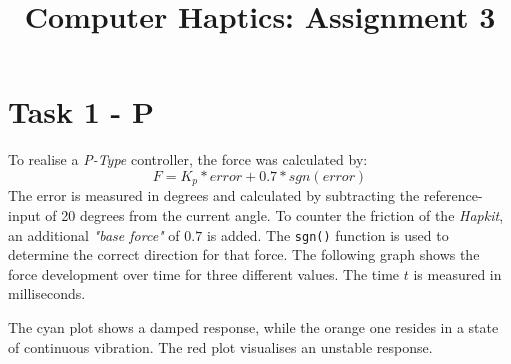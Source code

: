 



  \title{Computer Haptics: Assignment 3}
  \maketitle

  \section*{Task 1 - P}

  To realise a \textit{P-Type} controller, the force was calculated by:
  \begin{equation*}
    F = K_p * error + 0.7 * sgn(error)
  \end{equation*}
  The error is measured in degrees and calculated by subtracting the reference-input of 20 degrees from the current angle. To counter the friction of the \textit{Hapkit}, an additional \textit{"base force"} of $0.7$ is added. The \texttt{sgn()} function is used to determine the correct direction for that force. The following graph shows the force development over time for three different values. The time $t$ is measured in milliseconds.

  \begin{figure}[H]
    \centering
  \end{figure}

  The cyan plot shows a damped response, while the orange one resides in a state of continuous vibration. The red plot visualises an unstable response.

